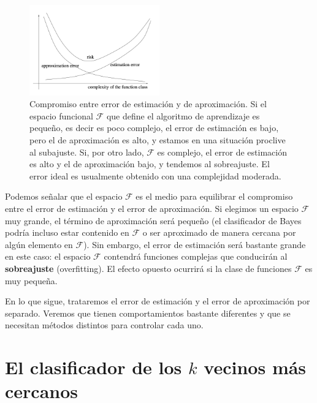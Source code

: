\documentclass{report}
\begin{document}
\begin{figure}[ht!]
    \centering
    \includegraphics[width=0.5\textwidth]{Images/3.png}
    \caption{Compromiso entre error de estimación y de aproximación. Si el espacio funcional $\mathcal{F}$ que define
    el algoritmo de aprendizaje es pequeño, es decir es poco complejo, el error de estimación es bajo, pero el de aproximación
    es alto, y estamos en una situación proclive al subajuste. Si, por otro lado,  $\mathcal{F}$ es complejo, el error de estimación
    es alto y el de aproximación bajo, y tendemos al sobreajuste. El error ideal es usualmente obtenido con una complejidad moderada.}
    \label{fig:Compromiso entre error de estimación y de aproximación.}
\end{figure}



Podemos señalar que el espacio \(\mathcal{F}\) es el medio para equilibrar el compromiso 
entre el error de estimación y el error de aproximación. Si elegimos un espacio \(\mathcal{F}\) muy grande, el 
término de aproximación será pequeño (el clasificador de Bayes podría incluso estar contenido en 
\(\mathcal{F}\) o ser aproximado de manera cercana por algún elemento en \(\mathcal{F}\)). Sin embargo, el error de 
estimación será bastante grande en este caso: el espacio \(\mathcal{F}\) contendrá funciones complejas que 
conducirán al \textbf{sobreajuste} (overfitting). El efecto opuesto ocurrirá si la clase de funciones 
\(\mathcal{F}\) es muy pequeña.\newline


En lo que sigue, trataremos el error de estimación y el error de aproximación por separado. Veremos 
que tienen comportamientos bastante diferentes y que se necesitan métodos distintos para controlar 
cada uno.\newline

\section{El clasificador de los $k$ vecinos más cercanos}
\end{document}
